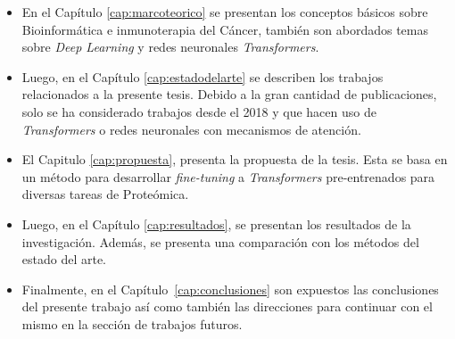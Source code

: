 \begin{itemize}
	\item En el Capítulo \ref{cap:marcoteorico} se presentan los conceptos básicos sobre Bioinformática e inmunoterapia del Cáncer, también son abordados temas sobre \textit{Deep Learning} y redes neuronales \textit{Transformers}.
	
	\item Luego, en el Capítulo \ref{cap:estadodelarte} se describen los trabajos relacionados a la presente tesis. Debido a la gran cantidad de publicaciones, solo se ha considerado trabajos desde el 2018 y que hacen uso de \textit{Transformers} o redes neuronales con mecanismos de atención.
	
	\item El Capitulo \ref{cap:propuesta}, presenta la propuesta de la tesis. Esta se basa en un método para desarrollar \textit{fine-tuning} a \textit{Transformers} pre-entrenados para diversas tareas de Proteómica. 
	
	\item Luego, en el Capítulo  \ref{cap:resultados}, se presentan los resultados de la investigación. Además, se presenta una comparación con los métodos del estado del arte.
	
	\item Finalmente, en el Capítulo~\ref{cap:conclusiones} son expuestos las conclusiones del presente trabajo así como también las direcciones para continuar con el mismo en la sección de trabajos futuros.
	
	
	
\end{itemize}







